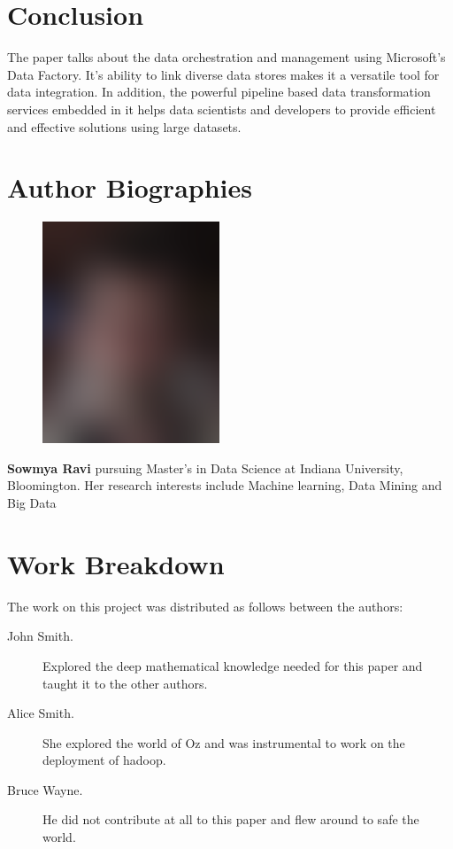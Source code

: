 \documentclass[9pt,twocolumn,twoside]{styles/osajnl}
\begin{document}
\section{Conclusion}
The paper talks about the data orchestration and management using Microsoft's Data Factory. It's ability to link diverse data stores makes it a versatile tool for data integration. In addition, the powerful pipeline based data transformation services embedded in it helps data scientists and developers to provide efficient and effective solutions using large datasets. 



 
\section*{Author Biographies}
\begingroup
\setlength\intextsep{0pt}
\begin{minipage}[t][3.2cm][t]{1.0\columnwidth} %
  \begin{figure}
    \includegraphics[width=0.25\columnwidth]{images/john_smith.eps}
  \end{figure}
  \noindent
  {\bfseries Sowmya Ravi} pursuing Master's in Data Science at Indiana University, Bloomington. Her research interests include Machine learning, Data Mining and Big Data
\end{minipage}

\endgroup

\newpage

\appendix

\section{Work Breakdown}

The work on this project was distributed as follows between the
authors:

\begin{description}

\item[John Smith.] Explored the deep mathematical knowledge needed for
  this paper and taught it to the other authors.

\item[Alice Smith.] She explored the world of Oz and was instrumental
  to work on the deployment of hadoop.

\item[Bruce Wayne.] He did not contribute at all to this paper and
  flew around to safe the world.  

\end{description}
\end{document}
